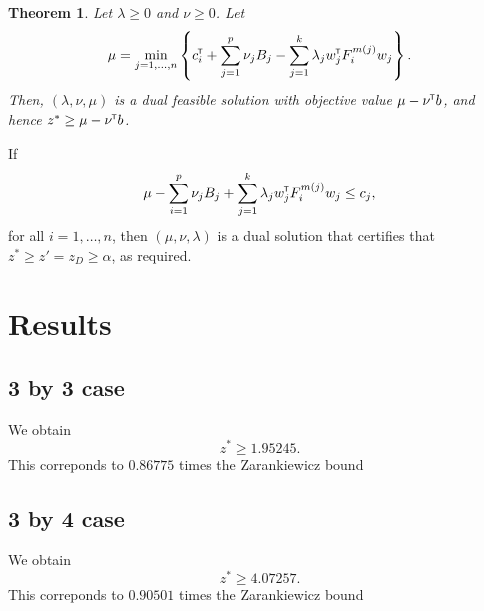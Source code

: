 \documentclass{article}
\newtheorem{theorem}{Theorem}
\def\T{{\mbox{\hspace{-.05em}\scalebox{0.66}{\footnotesize\sffamily T}}}}
\begin{document}
\begin{theorem}
Let $\lambda \geq 0$ and $\nu\geq 0$. Let
\[
\mu = \min_{j=1, \hdots, n} \left\{c^\T_i + \sum_{j=1}^p \nu_j B_j - \sum_{j=1}^k \lambda_j w_j^\T F^{m(j)}_i w_j\right\}.
\]
Then, $(\lambda, \nu, \mu)$ is a dual feasible solution with objective value
$\mu - \nu^\T b$, and hence $z^* \geq \mu - \nu^\T b$.
\end{theorem}

If
\[
\mu - \sum_{i=1}^p \nu_j B_j + \sum_{j=1}^k \lambda_j w_j^\T F^{m(j)}_i w_j  \leq 
c_j, 
\]
for all $i=1,\hdots, n$, then $(\mu, \nu, \lambda)$ is a dual solution
that certifies that $z^* \geq z' = z_D \geq \alpha$, as required.



\section{Results}

\subsection{3 by 3 case}
We obtain
\[
z^* \geq 1.95245.
\]
This correponds to $0.86775$ times the Zarankiewicz bound

\subsection{3 by 4 case}
We obtain
\[
z^* \geq 4.07257.
\]
This correponds to $0.90501$ times the Zarankiewicz bound
\end{document}
